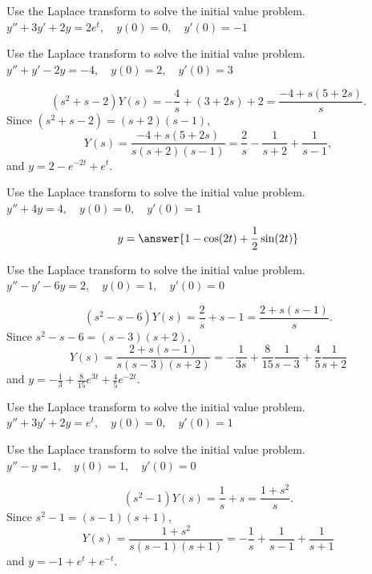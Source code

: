 \documentclass{ximera}
\begin{document}
\begin{problem}\label{exer:8.3.11} Use the Laplace transform to solve the initial value problem. $y''+3y'+2y=2e^t, \quad  y(0)=0,\quad y'(0)=-1$
\end{problem}

\begin{problem}\label{exer:8.3.12} Use the Laplace transform to solve the initial value problem. $y''+y'-2y=-4, \quad  y(0)=2,\quad y'(0)=3$

\begin{solution}
$$
(s^2+s-2)Y(s)=-\frac{4}{s}+(3+2s)+2=\frac{-4+s(5+2s)}{s}.
$$
Since $(s^2+s-2)=(s+2)(s-1)$,
$$
Y(s)=\frac{-4+s(5+2s)}{s(s+2)(s-1)}
=\frac{2}{s}-\frac{1}{s+2}+\frac{1}{s-1},
$$
and  $y=2-e^{-2t}+e^t$.
\end{solution}
\end{problem}

\begin{problem}\label{exer:8.3.13} Use the Laplace transform to solve the initial value problem. $y''+4y=4, \quad  y(0)=0,\quad y'(0)=1$

$$y=\answer{1-\cos(2t)+\frac{1}{2}\sin(2t)}$$

\end{problem}

\begin{problem}\label{exer:8.3.14} Use the Laplace transform to solve the initial value problem. $y''-y'-6y=2, \quad  y(0)=1,\quad y'(0)=0$

\begin{solution}
$$
 (s^2-s-6)Y(s)=\frac{2}{s}+s-1=\frac{2+s(s-1)}{s}.
$$
Since $s^2-s-6=(s-3)(s+2)$,
$$
Y(s)=\frac{2+s(s-1)}{s(s-3)(s+2)}=
-\frac{1}{3s}+\frac{8}{15}\frac{1}{s-3}+\frac{4}{5}\frac{1}{s+2}
$$
and
 $y=-\frac{1}{3}+\frac{8}{15}e^{3t}
+\frac{4}{5}e^{-2t}$.
\end{solution}
\end{problem}

\begin{problem}\label{exer:8.3.15} Use the Laplace transform to solve the initial value problem. $y''+3y'+2y=e^t, \quad  y(0)=0,\quad y'(0)=1$
\end{problem}

\begin{problem}\label{exer:8.3.16} Use the Laplace transform to solve the initial value problem. $y''-y=1, \quad  y(0)=1,\quad y'(0)=0$

\begin{solution}
$$
(s^2-1)Y(s)=\frac{1}{s}+s=\frac{1+s^2}{s}.
$$
Since $s^2-1=(s-1)(s+1)$,
$$
Y(s)=\frac{1+s^2}{s(s-1)(s+1)}=
-\frac{1}{s}+\frac{1}{s-1}+\frac{1}{s+1}
$$
and
 $y=-1+e^t+e^{-t}$.
\end{solution}
\end{problem}
\end{document}
